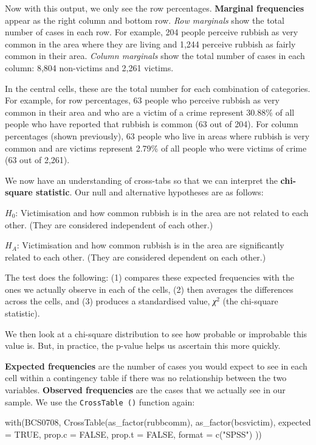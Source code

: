 \documentclass[
]{book}
\newenvironment{Shaded}{\begin{snugshade}}{\end{snugshade}}
\newcommand{\AttributeTok}[1]{\textcolor[rgb]{0.77,0.63,0.00}{#1}}
\newcommand{\ConstantTok}[1]{\textcolor[rgb]{0.00,0.00,0.00}{#1}}
\newcommand{\FunctionTok}[1]{\textcolor[rgb]{0.00,0.00,0.00}{#1}}
\newcommand{\NormalTok}[1]{#1}
\newcommand{\StringTok}[1]{\textcolor[rgb]{0.31,0.60,0.02}{#1}}
\begin{document}
Now with this output, we only see the row percentages. \textbf{Marginal frequencies} appear as the right column and bottom row. \emph{Row marginals} show the total number of cases in each row. For example, 204 people perceive rubbish as very common in the area where they are living and 1,244 perceive rubbish as fairly common in their area. \emph{Column marginals} show the total number of cases in each column: 8,804 non-victims and 2,261 victims.

In the central cells, these are the total number for each combination of categories. For example, for row percentages, 63 people who perceive rubbish as very common in their area and who are a victim of a crime represent 30.88\% of all people who have reported that rubbish is common (63 out of 204). For column percentages (shown previously), 63 people who live in areas where rubbish is very common and are victims represent 2.79\% of all people who were victims of crime (63 out of 2,261).

We now have an understanding of cross-tabs so that we can interpret the \textbf{chi-square statistic}. Our null and alternative hypotheses are as follows:

\(H_0\): Victimisation and how common rubbish is in the area are not related to each other. (They are considered independent of each other.)

\(H_A\): Victimisation and how common rubbish is in the area are significantly related to each other. (They are considered dependent on each other.)

The test does the following:
(1) compares these expected frequencies with the ones we actually observe in each of the cells, (2) then averages the differences across the cells, and (3) produces a standardised value, \emph{χ}\(^2\) (the chi-square statistic).

We then look at a chi-square distribution to see how probable or improbable this value is. But, in practice, the p-value helps us ascertain this more quickly.

\textbf{Expected frequencies} are the number of cases you would expect to see in each cell within a contingency table if there was no relationship between the two variables. \textbf{Observed frequencies} are the cases that we actually see in our sample. We use the \texttt{CrossTable\ ()} function again:

\begin{Shaded}
\begin{Highlighting}[]
\FunctionTok{with}\NormalTok{(BCS0708, }\FunctionTok{CrossTable}\NormalTok{(}\FunctionTok{as\_factor}\NormalTok{(rubbcomm), }
                         \FunctionTok{as\_factor}\NormalTok{(bcsvictim), }
                         \AttributeTok{expected =} \ConstantTok{TRUE}\NormalTok{, }\AttributeTok{prop.c =} \ConstantTok{FALSE}\NormalTok{, }\AttributeTok{prop.t =} \ConstantTok{FALSE}\NormalTok{, }\AttributeTok{format =}
                           \FunctionTok{c}\NormalTok{(}\StringTok{"SPSS"}\NormalTok{) ))}
\end{Highlighting}
\end{Shaded}
\end{document}
